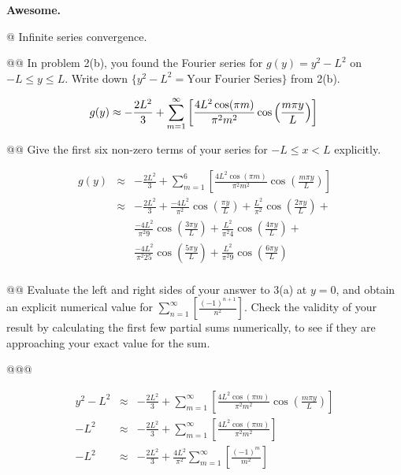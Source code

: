 \documentclass[10pt]{article}
\begin{document}
\begin{easylist}[enumerate]
    \textbf{Awesome.}

    \newpage
    @ Infinite series convergence.

    @@ In problem 2(b), you found the Fourier series for $g(y) = y^2 - L^2$ on $-L \le y \le L$. Write down
    $\{y^2-L^2=\text{Your Fourier Series}\}$ from 2(b).

    \[
        g(y) \approx -\frac{2 L^2}{3} + \sum_{m=1}^\infty \left[ \frac{4 L^2 \cos (\pi  m)}{\pi^2 m^2} \cos \left( \frac{m \pi y}{L} \right) \right]\\
    \]

    @@ Give the first six non-zero terms of your series for $-L \le x < L$ explicitly.

    \begin{align*}
        g(y) &\approx& -\frac{2 L^2}{3} + \sum_{m=1}^6 \left[ \frac{4 L^2 \cos (\pi  m)}{\pi^2 m^2} \cos \left( \frac{m \pi y}{L} \right) \right]\\
        &\approx& -\frac{2 L^2}{3} +
            \frac{-4L^2}{\pi^2}\cos\left(\frac{\pi y}{L}\right) +
            \frac{L^2}{\pi^2}\cos\left(\frac{2\pi y}{L}\right) +\\
            &&\frac{-4L^2}{\pi^2 9}\cos\left(\frac{3\pi y}{L}\right) +
            \frac{L^2}{\pi^2 4}\cos\left(\frac{4\pi y}{L}\right) +\\
            &&\frac{-4L^2}{\pi^2 25}\cos\left(\frac{5\pi y}{L}\right) +
            \frac{L^2}{\pi^2 9}\cos\left(\frac{6\pi y}{L}\right)\\
    \end{align*}

    @@ Evaluate the left and right sides of your answer to 3(a) at $y=0$, and obtain an explicit numerical value for
    $\sum_{n=1}^\infty \left[ \frac{{(-1)}^{n+1}}{n^2} \right]$. Check the validity of your result by calculating the
    first few partial sums numerically, to see if they are approaching your exact value for the sum.

    @@@

    \begin{align*}
        y^2 - L^2 &\approx& -\frac{2 L^2}{3} + \sum_{m=1}^\infty \left[ \frac{4 L^2 \cos (\pi  m)}{\pi^2 m^2} \cos \left( \frac{m \pi y}{L} \right) \right]\\
        -L^2 &\approx& -\frac{2 L^2}{3} + \sum_{m=1}^\infty \left[ \frac{4 L^2 \cos (\pi  m)}{\pi^2 m^2} \right]\\
        -L^2 &\approx& -\frac{2 L^2}{3} + \frac{4L^2}{\pi^2} \sum_{m=1}^\infty \left[ \frac{{(-1)}^m}{m^2} \right]\\
    \end{align*}


\end{easylist}
\end{document}
